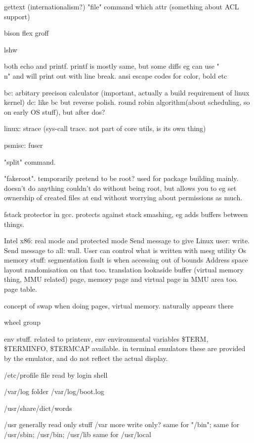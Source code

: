 gettext (internationalism?)
"file" command
which
attr (something about ACL support)



bison
flex
groff

lshw

both echo and printf. printf is mostly same, but some diffs eg can use "\\n" and will print out with line break.
ansi escape codes for color, bold etc

bc: arbitary precison calculator (important, actually a build requirement of linux kernel)
dc: like bc but reverse polish.
round robin algorithm(about scheduling, so on early OS stuff), but after dos?

linux: strace (sys-call trace. not part of core utils, is its own thing)

psmisc: fuser

"split" command.

"fakeroot". temporarily pretend to be root? used for package building mainly. doesn't do anything couldn't do without being root, but allows you to eg set ownership of created files at end without worrying about permissions as much.

fstack protector in gcc. protects against stack smashing, eg adds buffers between things.

Intel x86: real mode and protected mode
Send message to give Linux user: write. Send message to all: wall. User can control what is written with mesg utility
Os memory stuff: segmentation fault is when accessing out of bounds
Address space layout randomisation on that too.
translation lookaside buffer (virtual memory thing, MMU related)
page, memory page and virtual page in MMU area too. page table.

concept of swap when doing pages, virtual memory. naturally appears there

wheel group

env stuff. related to printenv, env
environmental variables \$TERM, \$TERMINFO, \$TERMCAP available. in terminal emulators these are provided by the emulator, and do not reflect the actual display.

/etc/profile file read by login shell

/var/log folder
/var/log/boot.log

/usr/share/dict/words

/usr generally read only stuff
/var more write only?
same for "/bin";
same for /usr/sbin; /usr/bin; /usr/lib
same for /usr/local

